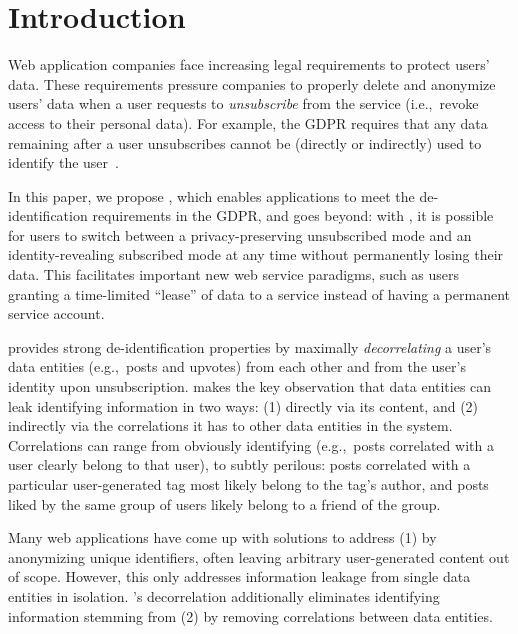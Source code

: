 \section{Introduction}

Web application companies face increasing legal requirements to protect users’ data. These
requirements pressure companies to properly delete and anonymize users' data when a user requests to
\emph{unsubscribe} from the service (i.e.,\ revoke access to their personal data). For example, the
GDPR requires that any data remaining after a user unsubscribes cannot be (directly or
indirectly) used to identify the user~\cite{gdpr}.  

In this paper, we propose \sys{}, which enables applications to meet the de-identification
requirements in the GDPR, and goes beyond: with \sys{}, it is possible for users to switch between a
privacy-preserving unsubscribed mode and an identity-revealing subscribed mode at any time without
permanently losing their data. This facilitates important new web service paradigms,
such as users granting a time-limited ``lease'' of data to a service instead of having a permanent
service account.

\sys{} provides strong de-identification properties by maximally \emph{decorrelating} a user's data
entities (e.g.,\ posts and upvotes) from each other and from the user's identity upon
unsubscription.  \sys{} makes the key observation that data entities can leak identifying
information in two ways: (1) directly via its content, and (2) indirectly via the correlations it has to
other data entities in the system.  
Correlations can range from obviously identifying (e.g.,\ posts correlated
with a user clearly belong to that user), to subtly perilous: posts correlated with a
particular user-generated tag most likely belong to the tag's author, and posts liked by the  
same group of users likely belong to a friend of the group. 

Many web applications have come up with solutions to address (1)
by anonymizing unique identifiers, often leaving arbitrary user-generated content out of scope.
However, this only addresses information leakage from single data entities in isolation.
\sys{}'s decorrelation additionally eliminates identifying information stemming from (2) by removing
correlations between data entities. 

